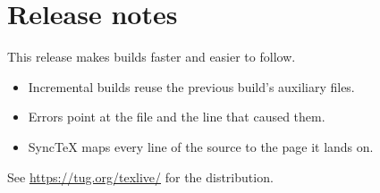 \documentclass[11pt]{article}
\begin{document}
\section*{Release notes}
This release makes builds faster and easier to follow.
\begin{itemize}
  \item Incremental builds reuse the previous build's auxiliary files.
  \item Errors point at the file and the line that caused them.
  \item SyncTeX maps every line of the source to the page it lands on.
\end{itemize}
See \url{https://tug.org/texlive/} for the distribution.
\end{document}
